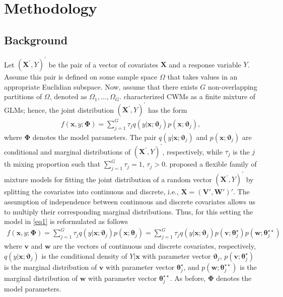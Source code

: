 \documentclass[11pt,letterpaper]{article}
\numberwithin{equation}{section}
\numberwithin{equation}{section}
\numberwithin{equation}{section}
\begin{document}
\section{Methodology}\label{sec:model}

\subsection{Background}

Let $(\bm{X^{'}}, Y)^{'}$  be the pair of a vector of covariates  $\bm{X}$ and a response variable $Y$. Assume this pair is defined on some sample space $\Omega$ that takes values in an appropriate Euclidian subspace. Now, assume that there exists $G$ non-overlapping partitions of $\Omega$, denoted as $\Omega_1, \ldots, \Omega_G$.  \cite{Gershenfeld:1997} characterized CWMs as a finite mixture of GLMs; hence, the joint distribution $(\bm{X^{'}}, Y )^{'}$ has the form
 \begin{align}
 f(\bm x, y; \bm{\Phi})= \sum_{j=1}^{G} \tau_j q(y|\bm{x};\bm{\vartheta}_j)p(\bm{x};\bm{\vartheta}_j),
\label{eq1}
\end{align}
where $\bm{\Phi}$ denotes the model parameters.
%
The pair $q(y|\bm{x};\bm{\vartheta}_j)$ and $p(\bm{x};\bm{\vartheta}_j)$ are conditional and marginal distributions of $(\bm{X^{'}}, Y)^{'}$, respectively, while $\tau_j$ is the $j$th mixing proportion such that $\sum_{j=1}^{G}\tau_j=1$, $\tau_j>0$.
\cite{Ingrassia+Punzo+Vittadini+Minotti:2015} proposed a flexible family of mixture models for fitting the joint distribution of a random vector $(\bm{X^{'}}, Y)^{'}$ by splitting the covariates into continuous and discrete, i.e., $ \bm{X}=(\bm{V}',  \bm{W}')'$. The assumption of independence between continuous and discrete covariates allows us to multiply their corresponding marginal distributions. Thus, for this setting the model in \eqref{eq1} is reformulated as follows
\begin{align}
 f(\bm{x}, y; \bm{\Phi})= \sum_{j=1}^{G} \tau_j q(y|\bm{x};\bm{\vartheta}_j)p(\bm{x};\bm{\theta}_j)=\sum_{j=1}^{G} \tau_j q(y|\bm{x};\bm{\vartheta}_j)p(\bm{v}; \bm{\theta}_j^{\star})p(\bm{w};\bm{\theta}_j^{\star\star})
\label{eq2}
\end{align}
where $\bm{v}$ and $\bm{w}$ are the vectors of continuous and discrete covariates, respectively, $q(y|\bm{x};\bm{\vartheta}_j)$ is the conditional density of $Y|\bm{x}$ with parameter vector $\bm{\vartheta}_j$, $p(\bm{v};\bm{\theta}_j^{\star})$ is the marginal distribution of $\bm{v}$ with parameter vector $\bm{\theta}_j^{\star}$, and $p(\bm{w};\bm{\theta}_j^{\star\star})$ is the marginal distribution of $\bm{w}$ with parameter vector $\bm{\theta}_j^{\star\star}$. As before, $\bm{\Phi}$ denotes the model parameters. %
\end{document}
